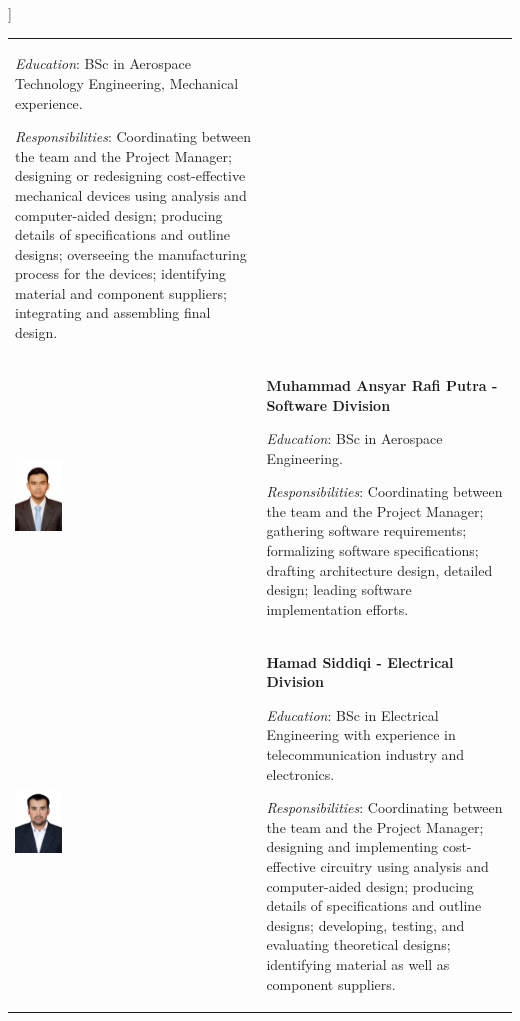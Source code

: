 ]\documentclass[a4paper,12pt,twoside]{article}
\begin{document}
\begin{longtable}[]{m{} m{}}
\smallskip
\textit{Education}: BSc in Aerospace Technology Engineering, Mechanical experience.

\smallskip
\textit{Responsibilities}: Coordinating between the team and the Project Manager; designing or redesigning cost-effective mechanical devices using analysis and computer-aided design; producing details of specifications and outline designs; overseeing the manufacturing process for the devices; identifying material and component suppliers; integrating and assembling final design.   \bigskip
\\

\includegraphics[width=0.2\textwidth]{1-introduction/img/muhammad-ansyar-rafi-putra.jpg} & \textbf{Muhammad Ansyar Rafi Putra - Software Division}

\smallskip
\textit{Education}: BSc in Aerospace Engineering.


\smallskip 
\textit{Responsibilities}: Coordinating between the team and the Project Manager; gathering software requirements; formalizing software specifications; drafting architecture design, detailed design; leading software implementation efforts.
\bigskip
\\

\includegraphics[width=0.2\textwidth]{1-introduction/img/hamad-saddiqi.jpg} & \textbf{Hamad Siddiqi - Electrical Division}

\smallskip
\textit{Education}: BSc in Electrical Engineering with experience in telecommunication industry and electronics.

\smallskip
\textit{Responsibilities}: Coordinating between the team and the Project Manager; designing and implementing cost-effective circuitry using analysis and computer-aided design; producing details of specifications and outline designs; developing, testing, and evaluating theoretical designs; identifying material as well as component suppliers. 
\bigskip
\\



\end{longtable}
\end{document}
